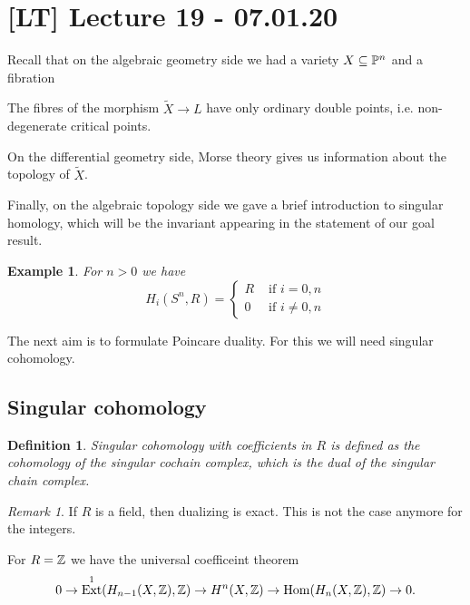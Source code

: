\documentclass[A4paper, british, reqno]{amsart}
\theoremstyle{darkgreentheorem}
\theoremstyle{darkbluedefinition}
\newtheorem{defn}[thm]{Definition}
\theoremstyle{darkredexample}
\newtheorem{exa}[thm]{Example}
\theoremstyle{remark}
\newtheorem{rem}[thm]{Remark}
\DeclareMathOperator{\Hom}{Hom}
\DeclareMathOperator{\Ext}{Ext}
\newcommand{\1}{\mathbbm{1}}
\newcommand{\dual}{^{\vee}}
\newcommand{\tms}{\times}
\newcommand{\sub}{\subseteq}
\begin{document}
\section{[LT] Lecture 19 - 07.01.20}

Recall that on the algebraic geometry side we had a variety $X\sub \P^{n}$ and a fibration
\begin{center}
\end{center}

The fibres of the morphism $\tilde{X}\to L$ have only ordinary double points, i.e. non-degenerate critical points.

On the differential geometry side, Morse theory gives us information about the topology of $\tilde{X}$.

Finally, on the algebraic topology side we gave a brief introduction to singular homology, which will be the invariant appearing in the statement of our goal result.

\begin{exa}
    For $n>0$ we have
    \[ H_{i}(S^{n},R)=\begin{cases}
	R & \text{ if } i=0,n\\
	0 & \text{ if } i\neq 0,n
    \end{cases}
    \]
\end{exa}

The next aim is to formulate Poincare duality.
For this we will need singular cohomology.

\subsection{Singular cohomology}

\begin{defn}
    \textit{Singular cohomology} with coefficients in $R$ is defined as the cohomology of the singular cochain complex, which is the dual of the singular chain complex.
\end{defn}

\begin{rem}
    If $R$ is a field, then dualizing is exact.
    This is not the case anymore for the integers.
\end{rem}

For $R=\mathbb{Z}$ we have the universal coefficeint theorem
\[ 0\to \Ext^{1}(H_{n-1}(X,\Z),\Z)\to H^{n}(X,\Z)\to \Hom(H_{n}(X,\Z),\Z)\to 0 .\]
\end{document}
